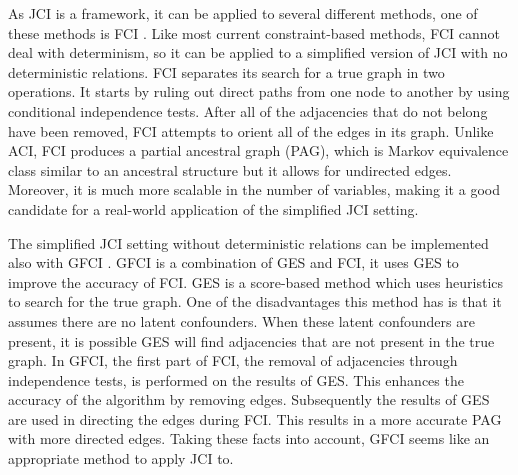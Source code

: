 \documentclass[11pt]{article}
\begin{document}

As JCI is a framework, it can be applied to several different methods, one of these methods is FCI \cite{fci}. Like most current constraint-based methods, FCI cannot deal with determinism, so it can be applied to a simplified version of JCI with no deterministic relations. FCI separates its search for a true graph in two operations. It starts by ruling out direct paths from one node to another by using conditional independence tests. After all of the adjacencies that do not belong have been removed, FCI attempts to orient all of the edges in its graph. Unlike ACI, FCI produces a partial ancestral graph (PAG), which is Markov equivalence class similar to an ancestral structure but it allows for undirected edges. Moreover, it is much more scalable in the number of variables, making it a good candidate for a real-world application of the simplified JCI setting.

The simplified JCI setting without deterministic relations can be implemented also with GFCI \cite{gfci}. GFCI is a combination of GES and FCI, it uses GES to improve the accuracy of FCI. GES \cite{ges} is a score-based method which uses heuristics to search for the true graph. One of the disadvantages this method has is that it assumes there are no latent confounders. When these latent confounders are present, it is possible GES will find adjacencies that are not present in the true graph.\cite[p.~372]{gfci}
In GFCI, the first part of FCI, the removal of adjacencies through independence tests, is performed on the results of GES. This enhances the accuracy of the algorithm by removing edges. Subsequently the results of GES are used in directing the edges during FCI. This results in a more accurate PAG with more directed edges. Taking these facts into account, GFCI seems like an appropriate method to apply JCI to.

\end{document}
